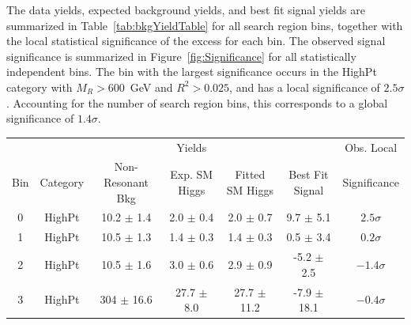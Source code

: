 The data yields, expected background yields, and best fit signal yields 
are summarized in Table~\ref{tab:bkgYieldTable} for all search region bins, together with the 
local statistical significance of the excess for each bin. The observed signal 
significance is summarized in Figure~\ref{fig:Significance} for all statistically independent bins.
The bin with the largest significance occurs in the HighPt category with $M_{R}>600$~GeV and $R^{2}>0.025$,
and has a local significance of $2.5\sigma$. Accounting for the number of search region bins,
this corresponds to a global significance of $1.4\sigma$.

\begin{table}[h]
\begin{center}
\tiny
\begin{tabular}{|cc|cccc|c|}
\hline
           &          &                   & Yields        &                 &                        & Obs. Local     \\ 
Bin        & Category &  Non-Resonant Bkg & Exp. SM Higgs & Fitted SM Higgs &  Best Fit Signal       & Significance   \\ 
\hline
0          & HighPt   &  10.2 $\pm$ 1.4   & 2.0 $\pm$ 0.4    & 2.0 $\pm$ 0.7    & 9.7 $\pm$ 5.1      & $2.5 \sigma$     \\
1          & HighPt   &  10.5 $\pm$ 1.3   & 1.4 $\pm$ 0.3    & 1.4 $\pm$ 0.3    & 0.5 $\pm$ 3.4      & $0.2 \sigma$     \\
2          & HighPt   &  10.5 $\pm$ 1.6   & 3.0 $\pm$ 0.6    & 2.9 $\pm$ 0.9    & -5.2 $\pm$ 2.5     & $-1.4 \sigma$    \\
3          & HighPt   &  304 $\pm$ 16.6   & 27.7 $\pm$ 8.0  & 27.7 $\pm$ 11.2  & -7.9 $\pm$ 18.1    & $-0.4 \sigma$    \\

\end{tabular}
\end{center}
\end{table}
